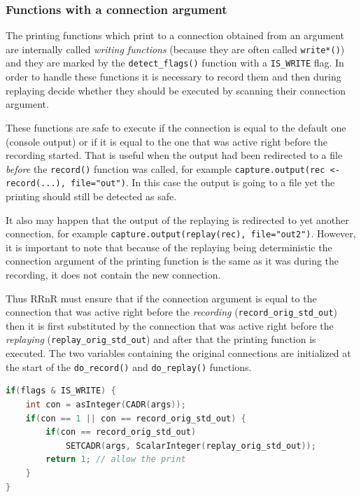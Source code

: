 \documentclass[thesis=M,english,hidelinks]{FITthesis}[2012/10/20]
\begin{document}
			\subsubsection{Functions with a connection argument}
			The printing functions which print to a connection obtained from an argument are internally called \emph{writing functions} (because they are often called \lstinline|write*()|) and they are marked by the \lstinline|detect_flags()| function with a \lstinline|IS_WRITE| flag. In order to handle these functions it is necessary to record them and then during replaying decide whether they should be executed by scanning their connection argument.\par
			
			These functions are safe to execute if the connection is equal to the default one (console output) or if it is equal to the one that was active right before the recording started. That is useful when the output had been redirected to a file \emph{before} the \lstinline|record()| function was called, for example \lstinline|capture.output(rec <- record(...), file="out")|. In this case the output is going to a file yet the printing should still be detected as safe.\par
			
			It also may happen that the output of the replaying is redirected to yet another connection, for example \lstinline|capture.output(replay(rec), file="out2")|. However, it is important to note that because of the replaying being deterministic the connection argument of the printing function is the same as it was during the recording, it does not contain the new connection.\par
			
			Thus RRnR must ensure that if the connection argument is equal to the connection that was active right before the \emph{recording} (\lstinline|record_orig_std_out|) then it is first substituted by the connection that was active right before the \emph{replaying} (\lstinline|replay_orig_std_out|) and after that the printing function is executed. The two variables containing the original connections are initialized at the start of the \lstinline|do_record()| and \lstinline|do_replay()| functions.\par
		
\begin{lstlisting}[style=filestyle, language=C, caption={Substituting connection argument in the writing function calls}]
if(flags & IS_WRITE) {
	int con = asInteger(CADR(args));
	if(con == 1 || con == record_orig_std_out) {
		if(con == record_orig_std_out)
			SETCADR(args, ScalarInteger(replay_orig_std_out));
		return 1; // allow the print
	}
}
\end{lstlisting}
		
\end{document}
